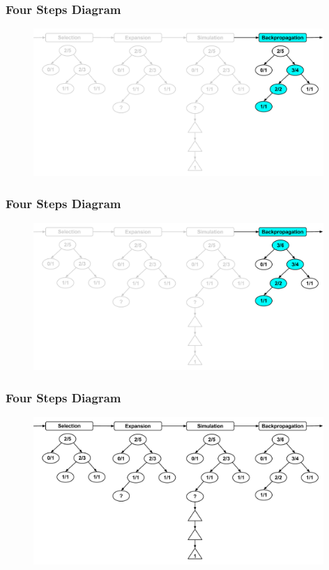 \documentclass{beamer}
\begin{document}
\begin{frame}[fragile]
\frametitle{Four Steps Diagram}
\begin{figure}[h]
	\includegraphics[width=11cm]{Diagrams/FourSteps/MCTSFourStepProcessFourThree.pdf}
	\centering
\end{figure}
\end{frame}

\begin{frame}[fragile]
\frametitle{Four Steps Diagram}
\begin{figure}[h]
	\includegraphics[width=11cm]{Diagrams/FourSteps/MCTSFourStepProcessFourFour.pdf}
	\centering
\end{figure}
\end{frame}

\begin{frame}[fragile]
\frametitle{Four Steps Diagram}
\begin{figure}[h]
	\includegraphics[width=11cm]{Diagrams/FourSteps/MCTSFourStepProcessWhole.pdf}
	\centering
\end{figure}
\end{frame}
\end{document}

